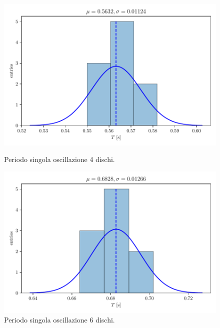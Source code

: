 \documentclass[titlepage]{article}
\numberwithin{equation}{section}
\numberwithin{figure}{section}
\numberwithin{table}{section}
\begin{document}
\begin{figure}[ht]
  \centering
  \begin{minipage}{0.5 \textwidth}
    \includegraphics[width=\textwidth]{Images/Histo_T4.pdf}
    \caption{Periodo singola oscillazione 4 dischi.}
  \end{minipage}%
  \begin{minipage}{0.5 \textwidth}
    \includegraphics[width=\textwidth]{Images/Histo_T6.pdf}
    \caption{Periodo singola oscillazione 6 dischi.}
  \end{minipage}
\end{figure}
\end{document}
